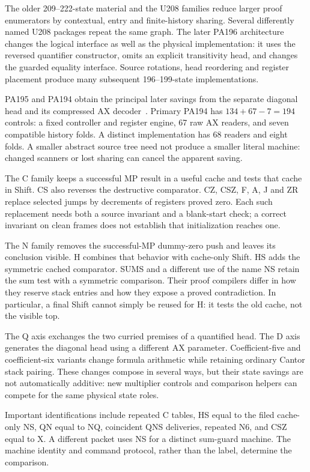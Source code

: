 \documentclass[11pt]{article}
\theoremstyle{definition}\newtheorem{definition}[theorem]{Definition}
\begin{document}
The older 209--222-state material and the U208 families reduce larger
proof enumerators by contextual, entry and finite-history sharing.
Several differently named U208 packages repeat the same graph. The
later PA196 architecture changes the logical interface as well as the
physical implementation: it uses the reversed quantifier constructor,
omits an explicit transitivity head, and changes the guarded equality
interface. Source rotations, head reordering and register placement
produce many subsequent 196--199-state implementations.

PA195 and PA194 obtain the principal later savings from the separate
diagonal head and its compressed AX decoder~\cite{primary}. Primary PA194 has
$134+67-7=194$ controls: a fixed controller and register engine, 67 raw
AX readers, and seven compatible history folds. A distinct implementation
has 68 readers and eight folds. A smaller abstract source tree need not
produce a smaller literal machine: changed scanners or lost sharing
can cancel the apparent saving.

The C family keeps a successful MP result in a useful cache and tests
that cache in Shift. CS also reverses the destructive comparator.
CZ, CSZ, F, A, J and ZR replace selected jumps by decrements of registers
proved zero. Each such replacement needs both a source invariant and a
blank-start check; a correct invariant on clean frames does not establish
that initialization reaches one.

The N family removes the successful-MP dummy-zero push and leaves its
conclusion visible. H combines that behavior with cache-only Shift.
HS adds the symmetric cached comparator. SUMS and a different use of the
name NS retain the sum test with a symmetric comparison. Their proof
compilers differ in how they reserve stack entries and how they expose
a proved contradiction. In particular, a final Shift cannot simply be
reused for H: it tests the old cache, not the visible top.

The Q axis exchanges the two curried premises of a quantified head.
The D axis generates the diagonal head using a different AX parameter.
Coefficient-five and coefficient-six variants change formula arithmetic
while retaining ordinary Cantor stack pairing. These changes compose
in several ways, but their state savings are not automatically additive:
new multiplier controls and comparison helpers can compete for the same
physical state roles.

Important identifications include repeated C tables, HS equal to the
filed cache-only NS, QN equal to NQ, coincident QNS deliveries, repeated
N6, and CSZ equal to X. A different packet uses NS for a distinct
sum-guard machine. The machine identity and command protocol, rather than
the label, determine the comparison.
\end{document}
